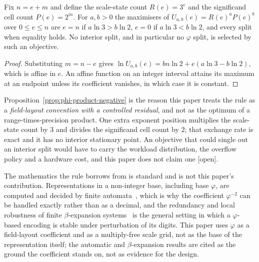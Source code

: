 \begin{proposition}
\label{prop:phi-product-negative}
Fix $n=e+m$ and define the scale-state count $R(e)=3^{e}$ and the significand
cell count $P(e)=2^{m}$. For $a,b>0$ the maximisers of
$U_{a,b}(e)=R(e)^{a}P(e)^{b}$ over $0\leq e\leq n$ are $e=n$ if
$a\ln3>b\ln2$, $e=0$ if $a\ln3<b\ln2$, and every split when equality holds. No
interior split, and in particular no $\varphi$ split, is selected by such an
objective.
\end{proposition}
\begin{proof}
Substituting $m=n-e$ gives
$\ln U_{a,b}(e)=bn\ln2+e(a\ln3-b\ln2)$, which is affine in $e$. An affine
function on an integer interval attains its maximum at an endpoint unless its
coefficient vanishes, in which case it is constant.
\end{proof}

Proposition~\ref{prop:phi-product-negative} is the reason this paper treats the
rule as a \emph{field-layout convention with a controlled residual}, and not as
the optimum of a range-times-precision product. One extra exponent position
multiplies the scale-state count by $3$ and divides the significand cell count by
$2$; that exchange rate is exact and it has no interior stationary point. An
objective that could single out an interior split would have to carry the
workload distribution, the overflow policy and a hardware cost, and this paper
does not claim one [open].

The mathematics the rule borrows from is standard and is not this paper's
contribution. Representations in a non-integer base, including base $\varphi$, are
computed and decided by finite automata~\cite{barnoff2024}, which is why the
coefficient $\varphi^{-2}$ can be handled exactly rather than as a decimal, and
the redundancy and local robustness of finite $\beta$-expansion
systems~\cite{betaexp2026} is the general setting in which a $\varphi$-based
encoding is stable under perturbation of its digits. This paper uses $\varphi$ as
a field-layout coefficient and as a multiply-free scale grid, not as the base of
the representation itself; the automatic and $\beta$-expansion results are cited
as the ground the coefficient stands on, not as evidence for the design.

